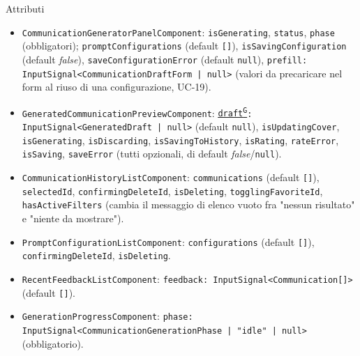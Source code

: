 \documentclass[a4paper,12pt]{article}
\providecommand{\glslink}[2]{\href{https://alittlebyte-19.github.io/Documentazione/glossario.html\#gls-#1}{\underline{#2}\textsuperscript{\scriptsize G}}}
\begin{document}
\begin{sloppypar}
Attributi
\begin{itemize}\raggedright
    \item \texttt{CommunicationGeneratorPanelComponent}: \texttt{isGenerating}, \texttt{status}, \texttt{phase} (obbligatori); \texttt{promptConfigurations} (default \texttt{[]}), \texttt{isSavingConfiguration} (default \textit{false}), \texttt{saveConfigurationError} (default \texttt{null}), \texttt{prefill: InputSignal<CommunicationDraftForm | null>} (valori da precaricare nel form al riuso di una configurazione, UC-19).
    \item \texttt{GeneratedCommunicationPreviewComponent}: \texttt{\glslink{bozza-draft}{draft}: InputSignal<GeneratedDraft | null>} (default \texttt{null}), \texttt{isUpdatingCover}, \texttt{isGenerating}, \texttt{isDiscarding}, \texttt{isSavingToHistory}, \texttt{isRating}, \texttt{rateError}, \texttt{isSaving}, \texttt{saveError} (tutti opzionali, di default \textit{false}/\texttt{null}).
    \item \texttt{CommunicationHistoryListComponent}: \texttt{communications} (default \texttt{[]}), \texttt{selectedId}, \texttt{confirmingDeleteId}, \texttt{isDeleting}, \texttt{togglingFavoriteId}, \texttt{hasActiveFilters} (cambia il messaggio di elenco vuoto fra "nessun risultato" e "niente da mostrare").
    \item \texttt{PromptConfigurationListComponent}: \texttt{configurations} (default \texttt{[]}), \texttt{confirmingDeleteId}, \texttt{isDeleting}.
    \item \texttt{RecentFeedbackListComponent}: \texttt{feedback: InputSignal<Communication[]>} (default \texttt{[]}).
    \item \texttt{GenerationProgressComponent}: \texttt{phase: InputSignal<CommunicationGenerationPhase | "idle" | null>} (obbligatorio).
\end{itemize}


\end{sloppypar}
\end{document}
